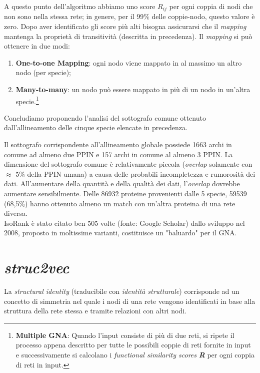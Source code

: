 \documentclass[11pt]{article}
\begin{document}
A questo punto dell'algoritmo abbiamo uno score $R_{ij}$ per ogni coppia di nodi che non sono nella stessa rete; in genere, per il 99\% delle coppie-nodo, questo valore è zero. Dopo aver identificato gli score più alti bisogna assicurarsi che il \textit{mapping} mantenga la proprietà di transitività (descritta in precedenza). Il \textit{mapping} si può ottenere in due modi: 
\begin{enumerate}
\setlength{\itemsep}{1pt}
  \setlength{\parskip}{0pt}
  \setlength{\parsep}{0pt}
\item \textbf{One-to-one Mapping}: ogni nodo viene mappato in al massimo un altro nodo (per specie);
\item \textbf{Many-to-many}: un nodo può essere mappato in più di un nodo in un'altra specie.\footnote{\textbf{Multiple GNA}: Quando l'input consiste di più di due reti, si ripete il processo appena descritto per tutte le possibili coppie di reti fornite in input e successivamente si calcolano i \textit{functional similarity scores} \textit{\textbf{R}} per ogni coppia di reti in input.}
\end{enumerate}

Concludiamo proponendo l'analisi del sottografo comune ottenuto dall'allineamento delle cinque specie elencate in precedenza.

Il sottografo corrispondente all'allineamento globale possiede 1663 archi in comune ad almeno due PPIN e 157 archi in comune al almeno 3 PPIN. La dimensione del sottografo comune è relativamente piccola (\textit{overlap} solamente con $\approx$ 5\% della PPIN umana) a causa delle probabili incompletezza e rumorosità dei dati. All'aumentare della quantità e della qualità dei dati, l'\textit{overlap} dovrebbe aumentare sensibilmente. Delle 86932 proteine provenienti dalle 5 specie, 59539 (68,5\%) hanno ottenuto almeno un match con un'altra proteina di una rete diversa.\\

IsoRank è stato citato ben 505 volte (fonte: Google Scholar) dallo sviluppo nel 2008, proposto in moltissime varianti, costituisce un "baluardo" per il GNA.

\pagebreak
\section{\textit{struc2vec}}
La \textit{structural identity} (traducibile con \textit{identità strutturale}) corrisponde ad un concetto di simmetria nel quale i nodi di una rete vengono identificati in base alla struttura della rete stessa e tramite relazioni con altri nodi. \\
\end{document}
